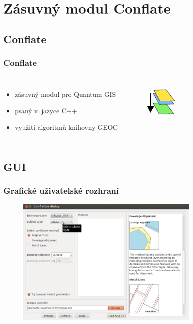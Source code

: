 \documentclass[unicode,bookmarksnumbered]{beamer}
\begin{document}
\section{Zásuvný modul Conflate}   %

  \subsection{Conflate} %
  \begin{frame}
  \frametitle{Conflate}
    \begin{columns}[c]
	\column{2.5in}
     \begin{itemize}
      \item zásuvný modul pro Quantum GIS %

      \item psaný v~jazyce C++
      \item využití algoritmů knihovny GEOC
     \end{itemize}
     	\column{1.5in}
	  \begin{figure}
             \includegraphics[width=0.6in]{./pictures/icon.pdf}
	  \label{fig:icon}
	  \end{figure}
      \end{columns}
    \vspace{0.5cm}
     \begin{figure}
      \centering
      \scriptsize
      \def\svgwidth{4in}
      
      \label{fig:schema}
  \end{figure} 
  \end{frame}

  \subsection{GUI} %
  \begin{frame}
  \frametitle{Grafické uživatelské rozhraní}
     \begin{figure}
	  \centering
             \includegraphics[height=2.5in]{./pictures/dialog2.png}
	  \label{fig:dialog1}
	  \end{figure}
  \end{frame}
\end{document}
